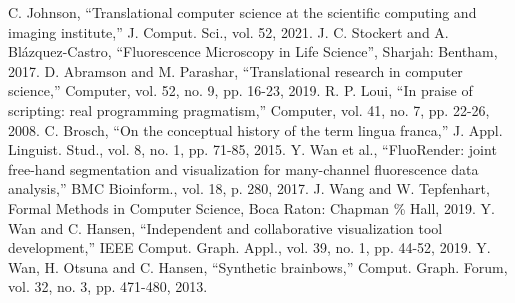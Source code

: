 \documentclass{IEEEcsmag}
\begin{document}
\def\refname{REFERENCES}

\begin{thebibliography}{1}

  C. Johnson, ``Translational computer science at the scientific computing and imaging institute,'' J. Comput. Sci., vol. 52, 2021.
 J. C. Stockert and A. Blázquez-Castro, ``Fluorescence Microscopy in Life Science'', Sharjah: Bentham, 2017.
 D. Abramson and M. Parashar, ``Translational research in computer science,'' Computer, vol. 52, no. 9, pp. 16-23, 2019.
 R. P. Loui, ``In praise of scripting: real programming pragmatism,'' Computer, vol. 41, no. 7, pp. 22-26, 2008.
 C. Brosch, ``On the conceptual history of the term lingua franca,'' J. Appl. Linguist. Stud., vol. 8, no. 1, pp. 71-85, 2015.
 Y. Wan et al., ``FluoRender: joint free-hand segmentation and visualization for many-channel fluorescence data analysis,'' BMC Bioinform., vol. 18, p. 280, 2017.
 J. Wang and W. Tepfenhart, Formal Methods in Computer Science, Boca Raton: Chapman \% Hall, 2019.
 Y. Wan and C. Hansen, ``Independent and collaborative visualization tool development,'' IEEE Comput. Graph. Appl., vol. 39, no. 1, pp. 44-52, 2019.
 Y. Wan, H. Otsuna and C. Hansen, ``Synthetic brainbows,'' Comput. Graph. Forum, vol. 32, no. 3, pp. 471-480, 2013. 

\end{thebibliography}

\newpage
\end{document}
